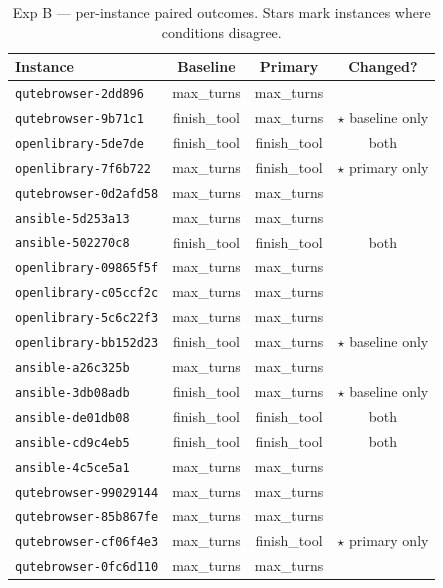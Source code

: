 \documentclass[11pt]{article}
\begin{document}
\begin{table}[h]
\centering
\small
\caption{Exp B --- per-instance paired outcomes. Stars mark instances where conditions disagree.}
\begin{tabular}{lccc}
\toprule
Instance & Baseline & Primary & Changed? \\
\midrule
\texttt{qutebrowser-2dd896} & max\_turns & max\_turns & \\
\texttt{qutebrowser-9b71c1} & finish\_tool & max\_turns & $\star$ baseline only \\
\texttt{openlibrary-5de7de} & finish\_tool & finish\_tool & both \\
\texttt{openlibrary-7f6b722} & max\_turns & finish\_tool & $\star$ primary only \\
\texttt{qutebrowser-0d2afd58} & max\_turns & max\_turns & \\
\texttt{ansible-5d253a13} & max\_turns & max\_turns & \\
\texttt{ansible-502270c8} & finish\_tool & finish\_tool & both \\
\texttt{openlibrary-09865f5f} & max\_turns & max\_turns & \\
\texttt{openlibrary-c05ccf2c} & max\_turns & max\_turns & \\
\texttt{openlibrary-5c6c22f3} & max\_turns & max\_turns & \\
\texttt{openlibrary-bb152d23} & finish\_tool & max\_turns & $\star$ baseline only \\
\texttt{ansible-a26c325b} & max\_turns & max\_turns & \\
\texttt{ansible-3db08adb} & finish\_tool & max\_turns & $\star$ baseline only \\
\texttt{ansible-de01db08} & finish\_tool & finish\_tool & both \\
\texttt{ansible-cd9c4eb5} & finish\_tool & finish\_tool & both \\
\texttt{ansible-4c5ce5a1} & max\_turns & max\_turns & \\
\texttt{qutebrowser-99029144} & max\_turns & max\_turns & \\
\texttt{qutebrowser-85b867fe} & max\_turns & max\_turns & \\
\texttt{qutebrowser-cf06f4e3} & max\_turns & finish\_tool & $\star$ primary only \\
\texttt{qutebrowser-0fc6d110} & max\_turns & max\_turns & \\
\bottomrule
\end{tabular}
\label{tab:exp_b_per_instance}
\end{table}
\end{document}
